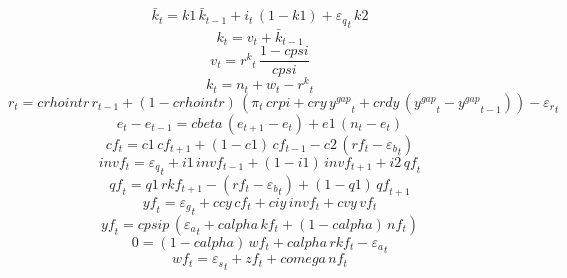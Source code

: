 \begin{dmath}
{{\bar{k}}}_{t}={k1}\, {{\bar{k}}}_{t-1}+{{i}}_{t}\, \left(1-{k1}\right)+{{\varepsilon_q}}_{t}\, {k2}
\end{dmath}
\begin{dmath}
{{k}}_{t}={{v}}_{t}+{{\bar{k}}}_{t-1}
\end{dmath}
\begin{dmath}
{{v}}_{t}={{r^{k}}}_{t}\, \frac{1-{cpsi}}{{cpsi}}
\end{dmath}
\begin{dmath}
{{k}}_{t}={{n}}_{t}+{{w}}_{t}-{{r^{k}}}_{t}
\end{dmath}
\begin{dmath}
{{r}}_{t}={crhointr}\, {{r}}_{t-1}+\left(1-{crhointr}\right)\, \left({{\pi}}_{t}\, {crpi}+{cry}\, {{y^{gap}}}_{t}+{crdy}\, \left({{y^{gap}}}_{t}-{{y^{gap}}}_{t-1}\right)\right)-{{\varepsilon_r}}_{t}
\end{dmath}
\begin{dmath}
{{e}}_{t}-{{e}}_{t-1}={cbeta}\, \left({{e}}_{t+1}-{{e}}_{t}\right)+{e1}\, \left({{n}}_{t}-{{e}}_{t}\right)
\end{dmath}
\begin{dmath}
{cf}_{t}={c1}\, {cf}_{t+1}+\left(1-{c1}\right)\, {cf}_{t-1}-{c2}\, \left({rf}_{t}-{{\varepsilon_b}}_{t}\right)
\end{dmath}
\begin{dmath}
{invf}_{t}={{\varepsilon_q}}_{t}+{i1}\, {invf}_{t-1}+\left(1-{i1}\right)\, {invf}_{t+1}+{i2}\, {qf}_{t}
\end{dmath}
\begin{dmath}
{qf}_{t}={q1}\, {rkf}_{t+1}-\left({rf}_{t}-{{\varepsilon_b}}_{t}\right)+\left(1-{q1}\right)\, {qf}_{t+1}
\end{dmath}
\begin{dmath}
{yf}_{t}={{\varepsilon_g}}_{t}+{ccy}\, {cf}_{t}+{ciy}\, {invf}_{t}+{cvy}\, {vf}_{t}
\end{dmath}
\begin{dmath}
{yf}_{t}={cpsip}\, \left({{\varepsilon_a}}_{t}+{calpha}\, {kf}_{t}+\left(1-{calpha}\right)\, {nf}_{t}\right)
\end{dmath}
\begin{dmath}
0=\left(1-{calpha}\right)\, {wf}_{t}+{calpha}\, {rkf}_{t}-{{\varepsilon_a}}_{t}
\end{dmath}
\begin{dmath}
{wf}_{t}={{\varepsilon_s}}_{t}+{zf}_{t}+{comega}\, {nf}_{t}
\end{dmath}
